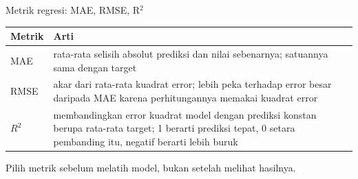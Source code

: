 \documentclass[aspectratio=169,t]{beamer}
\begin{document}
\begin{frame}{Metrik regresi: MAE, RMSE, R\texorpdfstring{$^2$}{2}}
  \vspace{0.5em}
  \begin{center}
  {\small\renewcommand{\arraystretch}{1.25}
  \begin{tabular}{p{1.5cm} p{9.2cm}}
    \toprule
    \rowcolor{nvcard}\color{nvgreen}\textbf{Metrik} & \color{nvgreen}\textbf{Arti} \\
    \midrule
    MAE & rata-rata selisih absolut prediksi dan nilai sebenarnya; satuannya sama dengan
          target \\
    \rowcolor{nvcard!60!nvbg} RMSE & akar dari rata-rata kuadrat error; lebih peka terhadap error
          besar daripada MAE karena perhitungannya memakai kuadrat error \\
    $R^2$ & membandingkan error kuadrat model dengan prediksi konstan berupa rata-rata target;
          1 berarti prediksi tepat, 0 setara pembanding itu, negatif berarti lebih buruk \\
    \bottomrule
  \end{tabular}}
  \end{center}
  \vspace{0.7em}
  {\footnotesize\color{nvgray}Pilih metrik sebelum melatih model, bukan setelah melihat hasilnya.}
\end{frame}
\end{document}
